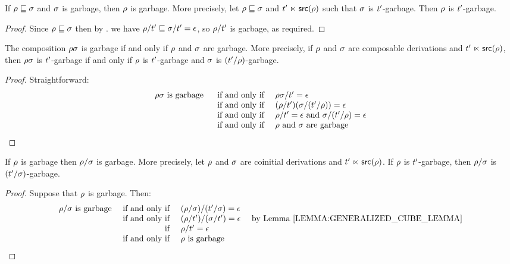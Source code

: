 \begin{lemma}
If $\rho \sqsubseteq \sigma$ and $\sigma$ is garbage, then $\rho$ is garbage.
More precisely, let $\rho \sqsubseteq \sigma$ and $t' \mathrel{\ltimes} \mathsf{src}(\rho)$
such that $\sigma$ is $t'$-garbage.
Then $\rho$ is $t'$-garbage.
\end{lemma}
\begin{proof}
Since $\rho \sqsubseteq \sigma$
then by .
we have $\rho/t' \sqsubseteq \sigma/t' = \epsilon$,
so $\rho/t'$ is garbage, as required.
\end{proof}

\begin{lemma}
The composition $\rho\sigma$ is garbage if and only if $\rho$ and $\sigma$ are garbage.
More precisely, if $\rho$ and $\sigma$ are composable derivations and $t' \mathrel{\ltimes} \mathsf{src}(\rho)$,
then
$\rho\sigma$ is $t'$-garbage
if and only if
$\rho$ is $t'$-garbage and $\sigma$ is $(t'/\rho)$-garbage.
\end{lemma}
\begin{proof}
Straightforward:
\[
  \begin{array}{rcl}
  \rho\sigma \text{ is garbage }
  & \text{ if and only if }
  & \rho\sigma/t' = \epsilon \\
  & \text{ if and only if }
  & (\rho/t')(\sigma/(t'/\rho)) = \epsilon \\
  & \text{ if and only if }
  & \rho/t' = \epsilon \text{ and } \sigma/(t'/\rho) = \epsilon \\
  & \text{ if and only if }
  & \rho \text{ and } \sigma \text{ are garbage}
  \end{array}
\]
\end{proof}

\begin{lemma}
If $\rho$ is garbage then $\rho/\sigma$ is garbage.
More precisely, let $\rho$ and $\sigma$ are coinitial derivations and $t' \mathrel{\ltimes} \mathsf{src}(\rho)$.
If $\rho$ is $t'$-garbage,
then $\rho/\sigma$ is $(t'/\sigma)$-garbage.
\end{lemma}
\begin{proof}
Suppose that $\rho$ is garbage. Then:
\[
  \begin{array}{rrll}
    \redseq/\redseqtwo \text{ is garbage}
  & \text{ if and only if }
  & (\redseq/\redseqtwo)/(\tm'/\redseqtwo) = \emptyDerivation \\
  & \text{ if and only if }
  & (\redseq/\tm')/(\redseqtwo/\tm') = \emptyDerivation & \text{ by \rlem{generalized_cube_lemma}} \\
  & \text{ if }
  & \redseq/\tm' = \emptyDerivation \\
  & \text{ if and only if }
  & \redseq \text{ is garbage}
  \end{array}
\]
\end{proof}

